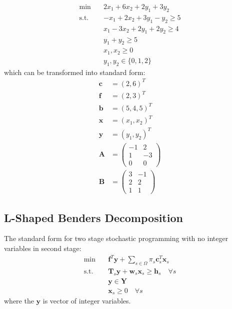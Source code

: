 \documentclass[fleqn,10pt]{wlscirep}
\begin{document}

\begin{align}
	\min \quad & 2 x_{1} + 6 x_{2} + 2 y_{1} + 3 y_{2} \\
    \text{s.t.} \quad & - x_{1} + 2 x_{2} + 3 y_{1} - y_{2} \geq 5 \\ 
    & x_{1} - 3 x_{2} + 2 y_{1} + 2 y_{2} \geq 4 \\
    & y_{1} + y_{2} \geq 5 \\
    & x_{1}, x_{2} \geq 0 \\
    & y_{1}, y_{2} \in \{0, 1, 2 \}
\end{align}
which can be transformed into standard form:
\begin{align}
	\mathbf{c} &= (2, 6)^T \\
    \mathbf{f} &= (2, 3)^T \\
    \mathbf{b} &= (5, 4, 5)^T \\
    \mathbf{x} &= (x_1, x_2)^T \\
    \mathbf{y} &= (y_1, y_2)^T \\
    \mathbf{A} &= \left(\begin{array}{c}
    	-1 & 2 \\
        1 & -3 \\
        0 & 0
    \end{array} \right) \\
    \mathbf{B} &= \left(\begin{array}{c}
    	3 & -1 \\
        2 & 2 \\
        1 & 1
    \end{array} \right)
\end{align}

\subsection{L-Shaped Benders Decomposition}

The standard form for two stage stochastic programming with no integer variables in second stage:
\begin{align}
    \min \quad& \mathbf{f} ^ { T } \mathbf{y} + \sum_{s \in \Omega} \pi_s \mathbf{c}_s^T \mathbf{x}_s \\
    \text{s.t.} \quad& \mathbf{T}_s \mathbf{y} + \mathbf{w}_s \mathbf{x}_s \geq \mathbf{h}_s \quad \forall s \\ 
    & \mathbf{y} \in \mathbf{Y} \\ 
    & \mathbf{x}_s \geq 0 \quad \forall s
\end{align}
where the $\mathbf{y}$ is vector of integer variables.
\end{document}
